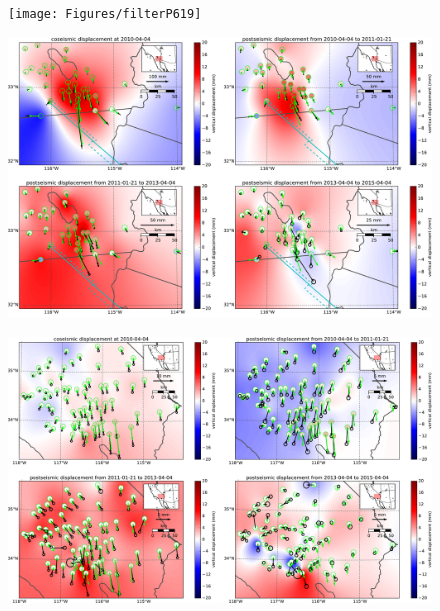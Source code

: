 \documentclass[1p]{elsarticle}
\begin{document}
\begin{figure}
\texttt{[image: Figures/filterP619]}
\centering
\caption{} 
\label{fig:P619}
\end{figure}

\begin{figure}
\includegraphics[scale=0.4]{Figures/nearfield}
\centering 
\caption{}
\label{fig:NearField}
\end{figure}

\begin{figure}
\includegraphics[scale=0.4]{Figures/farfield}
\centering 
\caption{}
\label{fig:FarField}
\end{figure}
\end{document}
